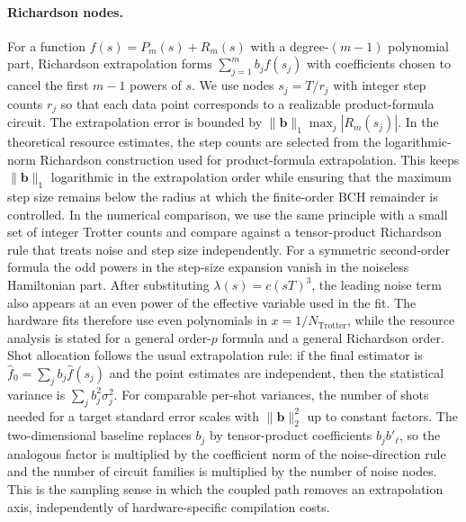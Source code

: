 \documentclass[aps,pra,reprint,superscriptaddress]{revtex4-2}
\begin{document}
\paragraph{Richardson nodes.}
For a function $f(s)=P_m(s)+R_m(s)$ with a degree-$(m-1)$ polynomial part, Richardson extrapolation forms $\sum_{j=1}^{m}b_j f(s_j)$ with coefficients chosen to cancel the first $m-1$ powers of $s$.
We use nodes $s_j=T/r_j$ with integer step counts $r_j$ so that each data point corresponds to a realizable product-formula circuit.
The extrapolation error is bounded by $\|\bm b\|_1\max_j |R_m(s_j)|$.
In the theoretical resource estimates, the step counts are selected from the logarithmic-norm Richardson construction used for product-formula extrapolation.
This keeps $\|\bm b\|_1$ logarithmic in the extrapolation order while ensuring that the maximum step size remains below the radius at which the finite-order BCH remainder is controlled.
In the numerical comparison, we use the same principle with a small set of integer Trotter counts and compare against a tensor-product Richardson rule that treats noise and step size independently.
For a symmetric second-order formula the odd powers in the step-size expansion vanish in the noiseless Hamiltonian part.
After substituting $\lambda(s)=c(sT)^3$, the leading noise term also appears at an even power of the effective variable used in the fit.
The hardware fits therefore use even polynomials in $x=1/N_{\mathrm{Trotter}}$, while the resource analysis is stated for a general order-$p$ formula and a general Richardson order.
Shot allocation follows the usual extrapolation rule: if the final estimator is $\hat f_0=\sum_j b_j\hat f(s_j)$ and the point estimates are independent, then the statistical variance is $\sum_j b_j^2\sigma_j^2$.
For comparable per-shot variances, the number of shots needed for a target standard error scales with $\|\bm b\|_2^2$ up to constant factors.
The two-dimensional baseline replaces $b_j$ by tensor-product coefficients $b_j b'_\ell$, so the analogous factor is multiplied by the coefficient norm of the noise-direction rule and the number of circuit families is multiplied by the number of noise nodes.
This is the sampling sense in which the coupled path removes an extrapolation axis, independently of hardware-specific compilation costs.
\end{document}
